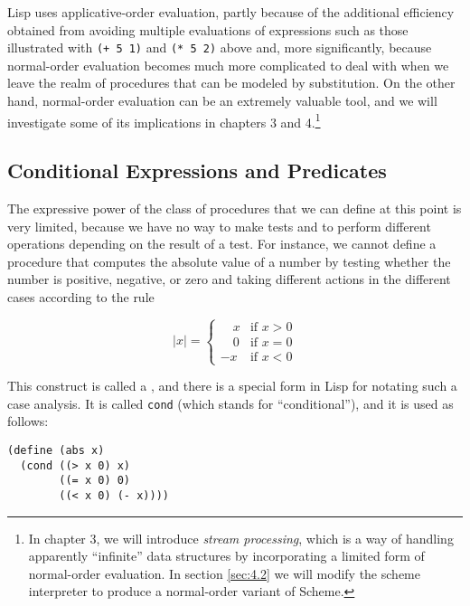 Lisp uses applicative-order evaluation, partly because of the
additional efficiency obtained from avoiding multiple evaluations of
expressions such as those illustrated with \texttt{(+ 5 1)} and
\texttt{(* 5 2)} above and, more significantly, because normal-order
evaluation becomes much more complicated to deal with when we leave
the realm of procedures that can be modeled by substitution.  On the
other hand, normal-order evaluation can be an extremely valuable tool,
and we will investigate some of its implications in chapters 3 and
4.\footnote{In chapter 3, we will introduce \textit{stream
    processing}, which is a way of handling apparently ``infinite''
  data structures by incorporating a limited form of normal-order
  evaluation.  In section \ref{sec:4.2} we will modify the scheme
  interpreter to produce a normal-order variant of Scheme.}

\subsection{Conditional Expressions and Predicates}
\label{sec:1.1.6}

The expressive power of the class of procedures that we can define at
this point is very limited, because we have no way to make tests and
to perform different operations depending on the result of a test.
For instance, we cannot define a procedure that computes the absolute
value of a number by testing whether the number is positive, negative,
or zero and taking different actions in the different cases according
to the rule

\begin{equation*}
  |x| = 
    \begin{cases}
       \quad x & \text{if } x > 0 \\
       \quad 0 & \text{if } x = 0 \\
       -x & \text{if } x < 0
    \end{cases}
\end{equation*}

This construct is called a , and
there is a special form in Lisp for notating such a case
analysis.  It is called \texttt{cond} (which stands for
``conditional''), and it is used as follows:

\begin{verbatim}
(define (abs x)
  (cond ((> x 0) x)
        ((= x 0) 0)
        ((< x 0) (- x))))
\end{verbatim}

